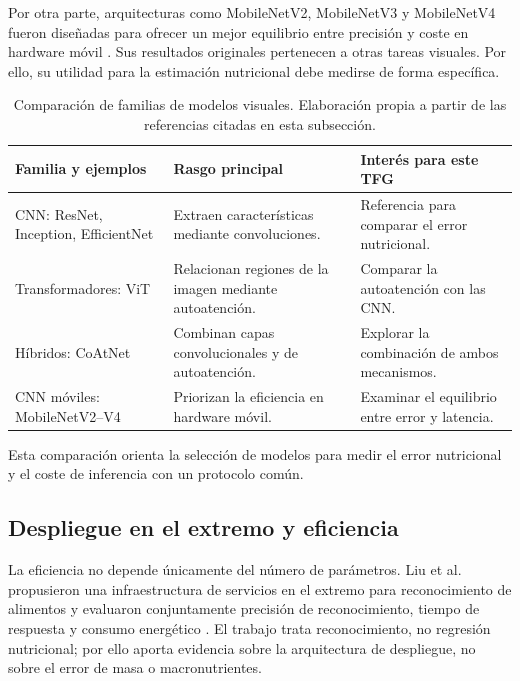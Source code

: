 Por otra parte, arquitecturas como MobileNetV2, MobileNetV3 y MobileNetV4 fueron
diseñadas para ofrecer un mejor equilibrio entre precisión y coste en hardware
móvil \citep{sandlerMobileNetV2InvertedResiduals2019,howardSearchingMobileNetV32019,qinMobileNetV4UniversalModels2024}.
Sus resultados originales pertenecen a otras tareas visuales. Por ello, su
utilidad para la estimación nutricional debe medirse de forma específica.

\begin{table}[H]
  \centering
  \small
  \begin{tabular}{@{}>{\raggedright\arraybackslash}p{}
                    >{\raggedright\arraybackslash}p{}
                    >{\raggedright\arraybackslash}p{}@{}}
    \toprule
    Familia y ejemplos & Rasgo principal & Interés para este TFG \\
    \midrule
    CNN: ResNet, Inception, EfficientNet & Extraen características mediante
    convoluciones. & Referencia para comparar el error nutricional. \\
    \addlinespace
    Transformadores: ViT & Relacionan regiones de la imagen mediante
    autoatención. & Comparar la autoatención con las CNN. \\
    \addlinespace
    Híbridos: CoAtNet & Combinan capas convolucionales y de autoatención. &
    Explorar la combinación de ambos mecanismos. \\
    \addlinespace
    CNN móviles: MobileNetV2--V4 & Priorizan la eficiencia en hardware móvil. &
    Examinar el equilibrio entre error y latencia. \\
    \bottomrule
  \end{tabular}
  \caption[Comparación de familias de modelos visuales]{Comparación de familias
  de modelos visuales. Elaboración propia a partir de las referencias citadas
  en esta subsección.}
  \label{tab:familias-modelos}
\end{table}

Esta comparación orienta la selección de modelos para medir el error
nutricional y el coste de inferencia con un protocolo común.

\subsection{Despliegue en el extremo y eficiencia}

La eficiencia no depende únicamente del número de parámetros. Liu et al.
propusieron una infraestructura de servicios en el extremo para reconocimiento
de alimentos y evaluaron conjuntamente precisión de reconocimiento, tiempo de
respuesta y consumo energético \citep{liuNewDeepLearningBased2018}. El trabajo
trata reconocimiento, no regresión nutricional; por ello aporta evidencia sobre
la arquitectura de despliegue, no sobre el error de masa o macronutrientes.

